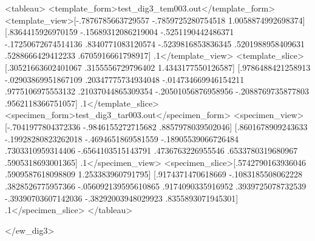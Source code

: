 \begin{DoxyVerbInclude}
<tableau>
<template_form>test_dig3_tem003.out</template_form>
<template_view>[-.7876785663729557 -.7859725280754518 1.0058874992698374] [.8364415926970159 -.15689312086219004 -.5251190442486371 -.17250672674514136 .8340771083120574 -.5239816853836345 .5201988958409631 .5288666429412233 .6705916661798917] .1</template_view>
<template_slice>[.30521663602401067 .3155556729796402 1.4343177550126587] [.9786488421258913 -.02903869951867109 .20347775734934048 -.014734669946154211 .9775106975553132 .21037044865309354 -.20501056876958956 -.2088769735877803 .9562118366751057] .1</template_slice>
<specimen_form>test_dig3_tar003.out</specimen_form>
<specimen_view>[-.7041977804372336 -.9846155272715682 .8857978039502046] [.8601678909243633 -.19928280823262018 -.4694651869581559 -.18905539066726484 .7303310959314406 -.6564103515143791 .4736763226955546 .6533780319680967 .5905318693001365] .1</specimen_view>
<specimen_slice>[.5742790163936046 .5909587618098809 1.253383960791795] [.9174371470618669 -.1083185508062228 .3828526775957366 -.056092139595610865 .9174090335916952 .3939725078732539 -.39390703607142036 -.38292003948029923 .8355893071945301] .1</specimen_slice>
</tableau>

</ew_dig3>
\end{DoxyVerbInclude}
 